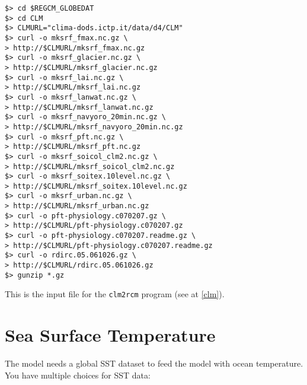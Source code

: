 \begin{Verbatim}
$> cd $REGCM_GLOBEDAT
$> cd CLM
$> CLMURL="clima-dods.ictp.it/data/d4/CLM"
$> curl -o mksrf_fmax.nc.gz \
> http://$CLMURL/mksrf_fmax.nc.gz
$> curl -o mksrf_glacier.nc.gz \
> http://$CLMURL/mksrf_glacier.nc.gz
$> curl -o mksrf_lai.nc.gz \
> http://$CLMURL/mksrf_lai.nc.gz
$> curl -o mksrf_lanwat.nc.gz \
> http://$CLMURL/mksrf_lanwat.nc.gz
$> curl -o mksrf_navyoro_20min.nc.gz \
> http://$CLMURL/mksrf_navyoro_20min.nc.gz
$> curl -o mksrf_pft.nc.gz \
> http://$CLMURL/mksrf_pft.nc.gz
$> curl -o mksrf_soicol_clm2.nc.gz \
> http://$CLMURL/mksrf_soicol_clm2.nc.gz
$> curl -o mksrf_soitex.10level.nc.gz \
> http://$CLMURL/mksrf_soitex.10level.nc.gz
$> curl -o mksrf_urban.nc.gz \
> http://$CLMURL/mksrf_urban.nc.gz
$> curl -o pft-physiology.c070207.gz \
> http://$CLMURL/pft-physiology.c070207.gz
$> curl -o pft-physiology.c070207.readme.gz \
> http://$CLMURL/pft-physiology.c070207.readme.gz
$> curl -o rdirc.05.061026.gz \
> http://$CLMURL/rdirc.05.061026.gz
$> gunzip *.gz
\end{Verbatim}

This is the input file for the \verb=clm2rcm= program (see at \ref{clm}).

\section{Sea Surface Temperature}

The model needs a global SST dataset to feed the model with ocean temperature.
You have multiple choices for SST data:

